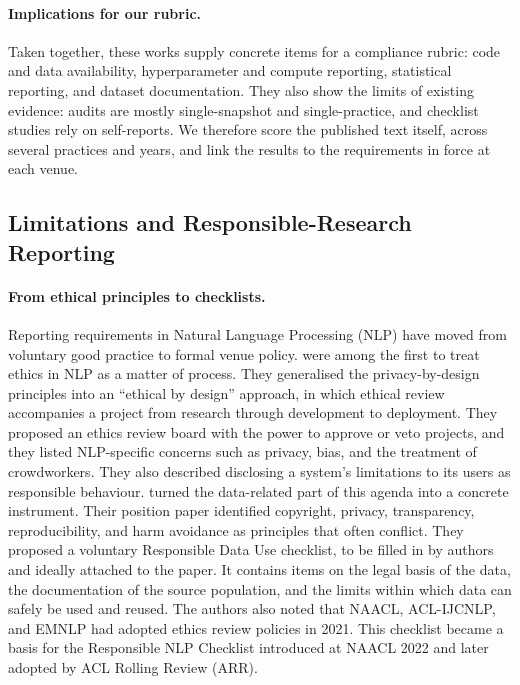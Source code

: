 \documentclass[11pt]{article}
\begin{document}
\paragraph{Implications for our rubric.}
Taken together, these works supply concrete items for a compliance rubric: code and data availability, hyperparameter and compute reporting, statistical reporting, and dataset documentation. They also show the limits of existing evidence: audits are mostly single-snapshot and single-practice, and checklist studies rely on self-reports. We therefore score the published text itself, across several practices and years, and link the results to the requirements in force at each venue.

\subsection{Limitations and Responsible-Research Reporting}

\paragraph{From ethical principles to checklists.}
Reporting requirements in Natural Language Processing (NLP) have moved from voluntary good practice to formal venue policy.
 were among the first to treat ethics in NLP as a matter of process.
They generalised the privacy-by-design principles into an ``ethical by design'' approach, in which ethical review accompanies a project from research through development to deployment.
They proposed an ethics review board with the power to approve or veto projects, and they listed NLP-specific concerns such as privacy, bias, and the treatment of crowdworkers.
They also described disclosing a system's limitations to its users as responsible behaviour.
 turned the data-related part of this agenda into a concrete instrument.
Their position paper identified copyright, privacy, transparency, reproducibility, and harm avoidance as principles that often conflict.
They proposed a voluntary Responsible Data Use checklist, to be filled in by authors and ideally attached to the paper.
It contains items on the legal basis of the data, the documentation of the source population, and the limits within which data can safely be used and reused.
The authors also noted that NAACL, ACL-IJCNLP, and EMNLP had adopted ethics review policies in 2021.
This checklist became a basis for the Responsible NLP Checklist introduced at NAACL 2022 and later adopted by ACL Rolling Review (ARR).
\end{document}
